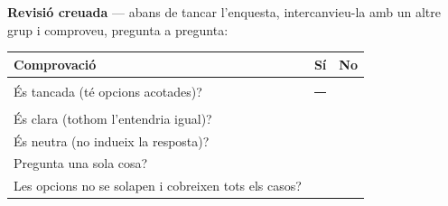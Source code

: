 \begin{idea}
\textbf{Revisió creuada} — abans de tancar l'enquesta, intercanvieu-la amb un altre
grup i comproveu, pregunta a pregunta:
\begin{center}
\renewcommand{\arraystretch}{1.4}
\begin{tabular}{p{8.4cm} c c}
\toprule
\textbf{Comprovació} & \textbf{Sí} & \textbf{No} \\
\midrule
És tancada (té opcions acotades)? & \rule{0.7cm}{0pt} & \\
És clara (tothom l'entendria igual)? & & \\
És neutra (no indueix la resposta)? & & \\
Pregunta una sola cosa? & & \\
Les opcions no se solapen i cobreixen tots els casos? & & \\
\bottomrule
\end{tabular}
\end{center}
\end{idea}

